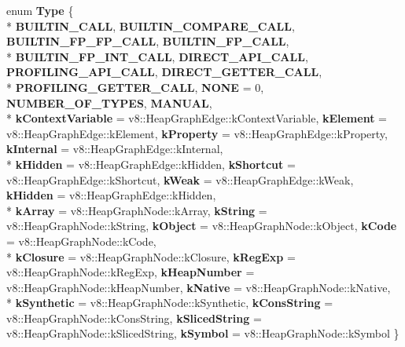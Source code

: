 \begin{DoxyCompactItemize}
\item 
\hypertarget{classv8_1_1internal_1_1_b_a_s_e___e_m_b_e_d_d_e_d_a86d4e2d8815ac6f9c09a8ff25971ffb9}{}enum {\bfseries Type} \{ \\*
{\bfseries B\+U\+I\+L\+T\+I\+N\+\_\+\+C\+A\+L\+L}, 
{\bfseries B\+U\+I\+L\+T\+I\+N\+\_\+\+C\+O\+M\+P\+A\+R\+E\+\_\+\+C\+A\+L\+L}, 
{\bfseries B\+U\+I\+L\+T\+I\+N\+\_\+\+F\+P\+\_\+\+F\+P\+\_\+\+C\+A\+L\+L}, 
{\bfseries B\+U\+I\+L\+T\+I\+N\+\_\+\+F\+P\+\_\+\+C\+A\+L\+L}, 
\\*
{\bfseries B\+U\+I\+L\+T\+I\+N\+\_\+\+F\+P\+\_\+\+I\+N\+T\+\_\+\+C\+A\+L\+L}, 
{\bfseries D\+I\+R\+E\+C\+T\+\_\+\+A\+P\+I\+\_\+\+C\+A\+L\+L}, 
{\bfseries P\+R\+O\+F\+I\+L\+I\+N\+G\+\_\+\+A\+P\+I\+\_\+\+C\+A\+L\+L}, 
{\bfseries D\+I\+R\+E\+C\+T\+\_\+\+G\+E\+T\+T\+E\+R\+\_\+\+C\+A\+L\+L}, 
\\*
{\bfseries P\+R\+O\+F\+I\+L\+I\+N\+G\+\_\+\+G\+E\+T\+T\+E\+R\+\_\+\+C\+A\+L\+L}, 
{\bfseries N\+O\+N\+E} = 0, 
{\bfseries N\+U\+M\+B\+E\+R\+\_\+\+O\+F\+\_\+\+T\+Y\+P\+E\+S}, 
{\bfseries M\+A\+N\+U\+A\+L}, 
\\*
{\bfseries k\+Context\+Variable} = v8\+:\+:Heap\+Graph\+Edge\+:\+:k\+Context\+Variable, 
{\bfseries k\+Element} = v8\+:\+:Heap\+Graph\+Edge\+:\+:k\+Element, 
{\bfseries k\+Property} = v8\+:\+:Heap\+Graph\+Edge\+:\+:k\+Property, 
{\bfseries k\+Internal} = v8\+:\+:Heap\+Graph\+Edge\+:\+:k\+Internal, 
\\*
{\bfseries k\+Hidden} = v8\+:\+:Heap\+Graph\+Edge\+:\+:k\+Hidden, 
{\bfseries k\+Shortcut} = v8\+:\+:Heap\+Graph\+Edge\+:\+:k\+Shortcut, 
{\bfseries k\+Weak} = v8\+:\+:Heap\+Graph\+Edge\+:\+:k\+Weak, 
{\bfseries k\+Hidden} = v8\+:\+:Heap\+Graph\+Edge\+:\+:k\+Hidden, 
\\*
{\bfseries k\+Array} = v8\+:\+:Heap\+Graph\+Node\+:\+:k\+Array, 
{\bfseries k\+String} = v8\+:\+:Heap\+Graph\+Node\+:\+:k\+String, 
{\bfseries k\+Object} = v8\+:\+:Heap\+Graph\+Node\+:\+:k\+Object, 
{\bfseries k\+Code} = v8\+:\+:Heap\+Graph\+Node\+:\+:k\+Code, 
\\*
{\bfseries k\+Closure} = v8\+:\+:Heap\+Graph\+Node\+:\+:k\+Closure, 
{\bfseries k\+Reg\+Exp} = v8\+:\+:Heap\+Graph\+Node\+:\+:k\+Reg\+Exp, 
{\bfseries k\+Heap\+Number} = v8\+:\+:Heap\+Graph\+Node\+:\+:k\+Heap\+Number, 
{\bfseries k\+Native} = v8\+:\+:Heap\+Graph\+Node\+:\+:k\+Native, 
\\*
{\bfseries k\+Synthetic} = v8\+:\+:Heap\+Graph\+Node\+:\+:k\+Synthetic, 
{\bfseries k\+Cons\+String} = v8\+:\+:Heap\+Graph\+Node\+:\+:k\+Cons\+String, 
{\bfseries k\+Sliced\+String} = v8\+:\+:Heap\+Graph\+Node\+:\+:k\+Sliced\+String, 
{\bfseries k\+Symbol} = v8\+:\+:Heap\+Graph\+Node\+:\+:k\+Symbol
 \}\label{classv8_1_1internal_1_1_b_a_s_e___e_m_b_e_d_d_e_d_a86d4e2d8815ac6f9c09a8ff25971ffb9}


\end{DoxyCompactItemize}
